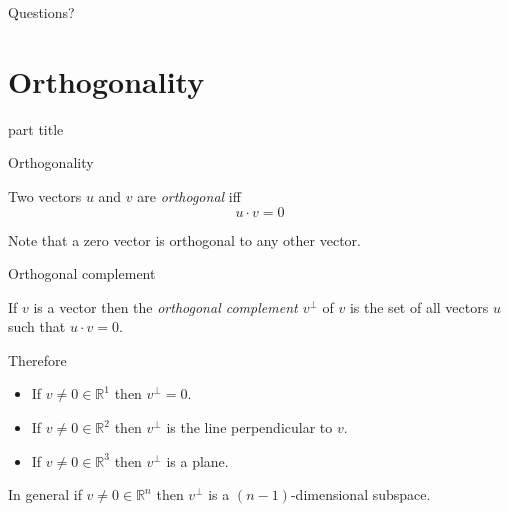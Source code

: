 \documentclass{beamer}
\begin{document}
\begin{frame}
  Questions?
\end{frame}

\section{Orthogonality}

\begin{frame}
  \begin{beamercolorbox}[sep=12pt,center]{part title}
    \insertsection\par
  \end{beamercolorbox}
\end{frame}

\begin{frame}{Orthogonality}
  \begin{definition}
    Two vectors $u$ and $v$ are \emph{orthogonal} iff
    \begin{equation*}
      u\cdot v = 0
    \end{equation*}
  \end{definition}\vfill
  Note that a zero vector is orthogonal to any other vector.
\end{frame}

\begin{frame}{Orthogonal complement}
  \begin{definition}
    If $v$ is a vector then the \emph{orthogonal complement $v^{\perp}$} of $v$ is the set of all vectors $u$ such that $u\cdot v = 0$.
  \end{definition}\vfill
  Therefore
  \begin{itemize}
  \item If $v\neq 0\in \mathbb R^1$ then $v^{\perp} = 0$.
  \item If $v\neq 0\in \mathbb R^2$ then $v^{\perp}$ is the line perpendicular to $v$.
  \item If $v\neq 0\in \mathbb R^3$ then $v^{\perp}$ is a plane.
  \end{itemize}\vfill
  In general if $v\neq 0 \in \mathbb R^n$ then $v^{\perp}$ is a $(n-1)$-dimensional subspace.
\end{frame}
\end{document}
